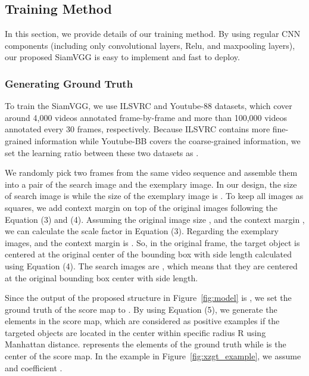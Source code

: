 \documentclass[runningheads]{llncs}
\begin{document}
\subsection{Training Method}

In this section, we provide details of our training method. By using regular CNN components (including only convolutional layers, Relu, and maxpooling layers), our proposed SiamVGG is easy to implement and fast to deploy.

\subsubsection{Generating Ground Truth}

To train the SiamVGG, we use ILSVRC and Youtube-88 datasets, which cover around 4,000 videos annotated frame-by-frame and more than 100,000 videos annotated every 30 frames, respectively. Because ILSVRC contains more fine-grained information while Youtube-BB covers the coarse-grained information, we set the learning ratio between these two datasets as . 

We randomly pick two frames from the same video sequence and assemble them into a pair of the search image and the exemplary image. In our design, the size of search image is  while the size of the exemplary image is . To keep all images as squares, we add context margin on top of the original images following the Equation (3) and (4). Assuming the original image size , and the context margin , we can calculate the scale factor  in Equation (3). 
Regarding the exemplary images,  and the context margin is . So, in the original frame, the target object is centered at the original center of the bounding box with side length  calculated using Equation (4). The search images are , which means that they are centered at the original bounding box center with  side length. 



Since the output of the proposed structure in Figure~\ref{fig:model} is , we set the ground truth of the score map to . By using Equation (5), we generate the elements in the score map, which are considered as positive examples if the targeted objects are located in the center within specific radius R using Manhattan distance.  represents the elements of the ground truth while  is the center of the score map. In the example in Figure~\ref{fig:xzgt_example}, we assume  and coefficient .
\end{document}

